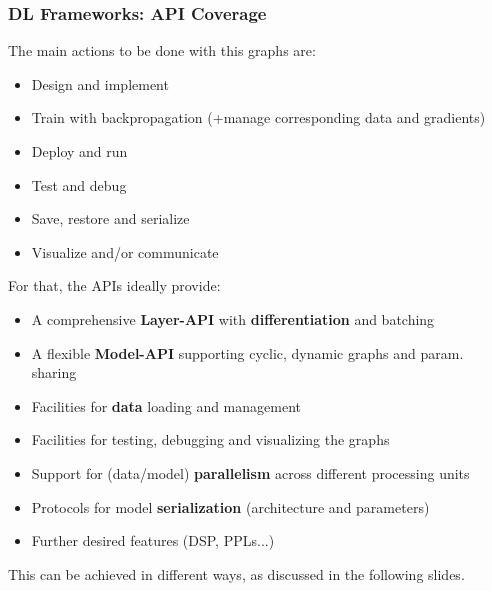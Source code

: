 \documentclass[hyperref={pdfpagelabels=false}]{beamer}
\begin{document}
      \begin{frame}
        \frametitle{DL Frameworks: API Coverage}
        The main actions to be done with this graphs are:
        \begin{itemize}[<.->]
       \item \small{Design and implement}
       \item \small{Train with backpropagation (+manage corresponding data and gradients)}
       \item \small{Deploy and run}
       \item \small{Test and debug}
       \item \small{Save, restore and serialize}
       \item \small{Visualize and/or communicate}
       \end{itemize}
        \vspace{2mm}
        For that, the APIs ideally provide:
       \begin{itemize}[<.->]
       \item \small{A comprehensive \textbf{Layer-API} with \textbf{differentiation} and batching}
       \item \small{A flexible \textbf{Model-API} supporting cyclic, dynamic graphs and param. sharing}
       \item \small{Facilities for \textbf{data} loading and management}
       \item \small{Facilities for testing, debugging and visualizing the graphs}
       \item \small{Support for (data/model) \textbf{parallelism} across different processing units}
       \item \small{Protocols for model \textbf{serialization} (architecture and parameters)}
       \item \small{Further desired features (DSP, PPLs...)}
       \end{itemize}
       \vspace{1mm}
       This can be achieved in different ways, as discussed in the following slides.
     \end{frame}


   
\end{document}
